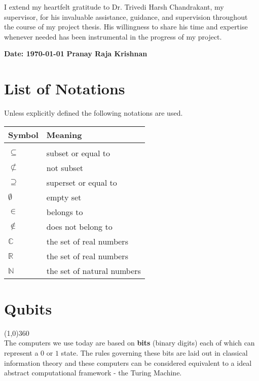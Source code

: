 \documentclass[12pt,twoside,fleqn]{report}
\theoremstyle{thmstyle}
\begin{document}
I extend my heartfelt gratitude to Dr. Trivedi Harsh Chandrakant, my supervisor, for his invaluable assistance, guidance, and supervision throughout the course of my project thesis. His willingness to share his time and expertise whenever needed has been instrumental in the progress of my project.


\vspace*{6cm}
\textbf{Date: \today}
\hfill{}
\textbf{Pranay Raja Krishnan}

\chapter*{List of Notations}
Unless explicitly defined the following notations are used.\\

\begin{tabular}{p{2cm}p{5cm}}
\textbf{Symbol} & \textbf{Meaning}\\
\hline
& \\
$\subseteq$ & subset or equal to \\%
$\not\subset$ & not subset\\%
$\supseteq$ & superset or equal to \\
$\emptyset$ & empty set\\%
$\in$ & belongs to\\%
$\not \in $ & does not belong to \\
$\mathbb{C}$ & the set of real numbers\\%
$\mathbb{R}$ & the set of real numbers\\%
$\mathbb{N}$ & the set of natural numbers\\%
\end{tabular}

\tableofcontents
\newpage
{}

\chapter{Qubits}

\line(1,0){360} \\

The computers we use today are based on \textbf{bits} (binary digits) each of which can represent a $0$ or $1$ state. The rules governing these bits are laid out in classical information theory and these computers can be considered equivalent to a ideal abstract computational framework - the Turing Machine.
\end{document}

